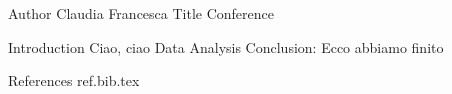 Author Claudia Francesca	
Title Conference

Introduction Ciao, ciao
Data
Analysis
Conclusion: Ecco abbiamo finito

References 
ref.bib.tex

